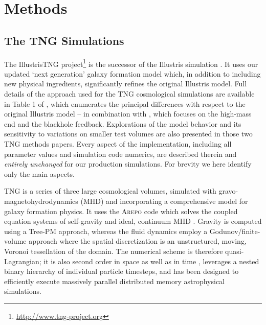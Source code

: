 \documentclass[useAMS,usenatbib]{mnras}
\begin{document}

\section{Methods} \label{sec_methods}

\subsection{The TNG Simulations} \label{sec_sims}

The IllustrisTNG project\footnote{\url{http://www.tng-project.org}} \citep{pillepich18, nelson18, naiman17, marinacci17, springel18} is the successor of the Illustris simulation \citep{vog14b,vog14a,genel14,sijacki15}. It uses our updated `next generation' galaxy formation model which, in addition to including new physical ingredients, significantly refines the original Illustris model. Full details of the approach used for the TNG cosmological simulations are available in Table 1 of \cite{pillepich17a}, which enumerates the principal differences with respect to the original Illustris model -- in combination with \cite{weinberger17}, which focuses on the high-mass end and the blackhole feedback. Explorations of the model behavior and its sensitivity to variations on smaller test volumes are also presented in those two TNG methods papers. Every aspect of the implementation, including all parameter values and simulation code numerics, are described therein and \textit{entirely unchanged} for our production simulations. For brevity we here identify only the main aspects.

TNG is a series of three large cosmological volumes, simulated with gravo-magnetohydrodynamics (MHD) and incorporating a comprehensive model for galaxy formation physics. It uses the \textsc{Arepo} code \citep{spr10} which solves the coupled equation systems of self-gravity and ideal, continuum MHD \citep{pakmor11,pakmor13}. Gravity is computed using a Tree-PM approach, whereas the fluid dynamics employ a Godunov/finite-volume approach where the spatial discretization is an unstructured, moving, Voronoi tessellation of the domain. The numerical scheme is therefore quasi-Lagrangian; it is also second order in space as well as in time \citep[see][]{pakmor16}, leverages a nested binary hierarchy of individual particle timesteps, and has been designed to efficiently execute massively parallel distributed memory astrophysical simulations.
\end{document}
